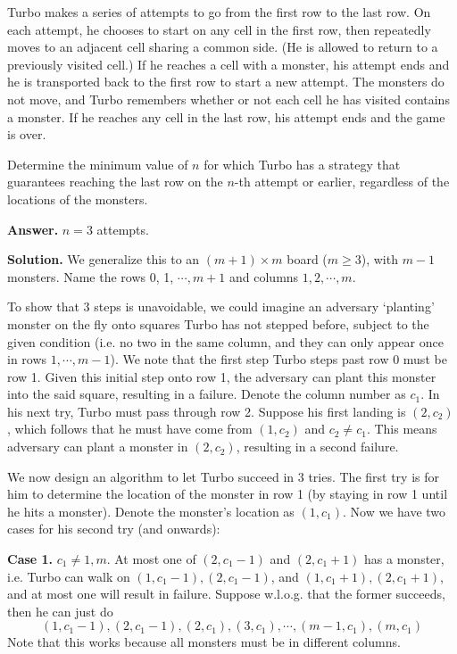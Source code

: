 \documentclass[11pt,a4paper]{article}
\begin{document}
\begin{enumerate}
    	Turbo makes a series of attempts to go from the first row to the last row. On each attempt, he chooses to start on any cell in the first row, then repeatedly moves to an adjacent cell sharing a common side. (He is allowed to return to a previously visited cell.) If he reaches a cell with a monster, his attempt ends and he is transported back to the first row to start a new attempt. The monsters do not move, and Turbo remembers whether or not each cell he has visited contains a monster. If he reaches any cell in the last row, his attempt ends and the game is over.
    	
    	Determine the minimum value of $n$ for which Turbo has a strategy that guarantees reaching the last row on the $n$-th attempt or earlier, regardless of the locations of the monsters.
    	
    	\textbf{Answer.} $n=3$ attempts. 
    	
    	\textbf{Solution.} We generalize this to an $(m+1)\times m$ board ($m\ge 3$), with $m - 1$ monsters.  
    	Name the rows 0, 1, $\cdots, m + 1$ and columns $1, 2, \cdots, m$. 
    	
    	To show that 3 steps is unavoidable, we could imagine an adversary `planting' monster on the fly onto squares Turbo has not stepped before, subject to the given condition 
    	(i.e. no two in the same column, and they can only appear once in rows $1, \cdots, m-1$). 
    	We note that the first step Turbo steps past row 0 must be row 1. 
    	Given this initial step onto row 1, the adversary can plant this monster into the said square, 
    	resulting in a failure. 
    	Denote the column number as $c_1$. 
    	In his next try, Turbo must pass through row 2. 
    	Suppose his first landing is $(2, c_2)$, 
    	which follows that he must have come from $(1, c_2)$ and $c_2\neq c_1$. 
    	This means adversary can plant a monster in $(2, c_2)$, 
    	resulting in a second failure. 
    	
    	We now design an algorithm to let Turbo succeed in 3 tries. 
    	The first try is for him to determine the location of the monster in row 1 (by staying in row 1 until he hits a monster). Denote the monster's location as $(1, c_1)$. 
    	Now we have two cases for his second try (and onwards): 
    	
    	\textbf{Case 1.} $c_1\neq 1, m$. 
    	At most one of $(2, c_1-1)$ and $(2, c_1+1)$ has a monster, i.e. Turbo can walk on 
    	$(1, c_1-1), (2, c_1-1)$, 
    	and $(1, c_1+1), (2, c_1+1)$, and at most one will result in failure. 
    	Suppose w.l.o.g. that the former succeeds, 
    	then he can just do 
    	\[
    	(1, c_1-1), (2, c_1-1), (2, c_1), (3, c_1), \cdots, (m-1, c_1), (m, c_1)
    	\]
    	Note that this works because all monsters must be in different columns. 
    	

\end{enumerate}
\end{document}
